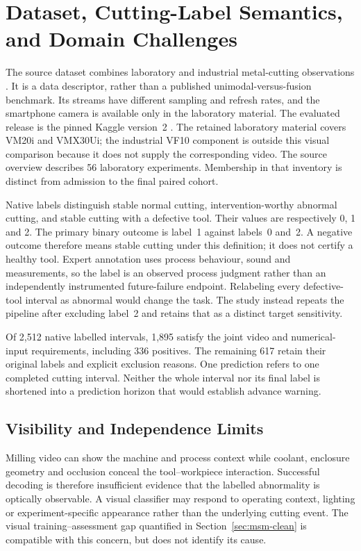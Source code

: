 \section{Dataset, Cutting-Label Semantics, and Domain Challenges}
The source dataset combines laboratory and industrial metal-cutting observations
\parencite{Kim2026MSM}. It is a data descriptor, rather than a published
unimodal-versus-fusion benchmark. Its streams have different sampling and refresh rates,
and the smartphone camera is available only in the laboratory material. The evaluated
release is the pinned Kaggle version~2 \parencite{MSMKaggle2025}. The retained laboratory
material covers VM20i and VMX30Ui; the industrial VF10 component is outside this visual
comparison because it does not supply the corresponding video. The source overview
describes 56 laboratory experiments. Membership in that inventory is distinct from
admission to the final paired cohort.

Native labels distinguish stable normal cutting, intervention-worthy abnormal cutting,
and stable cutting with a defective tool. Their values are respectively 0, 1 and 2. The
primary binary outcome is label~1 against labels~0 and~2. A negative outcome therefore
means stable cutting under this definition; it does not certify a healthy tool. Expert
annotation uses process behaviour, sound and measurements, so the label is an observed
process judgment rather than an independently instrumented future-failure endpoint.
Relabeling every defective-tool interval as abnormal would change the task. The study
instead repeats the pipeline after excluding label~2 and retains that as a distinct
target sensitivity.

Of 2,512 native labelled intervals, 1,895 satisfy the joint video and numerical-input
requirements, including 336 positives. The remaining 617 retain their original labels
and explicit exclusion reasons. One prediction refers to one completed cutting interval.
Neither the whole interval nor its final label is shortened into a prediction horizon
that would establish advance warning.

\subsection{Visibility and Independence Limits}
Milling video can show the machine and process context while coolant, enclosure geometry
and occlusion conceal the tool--workpiece interaction. Successful decoding is therefore
insufficient evidence that the labelled abnormality is optically observable. A visual
classifier may respond to operating context, lighting or experiment-specific appearance
rather than the underlying cutting event. The visual training--assessment
gap quantified in Section~\ref{sec:msm-clean} is compatible with this concern, but does not identify its cause.

